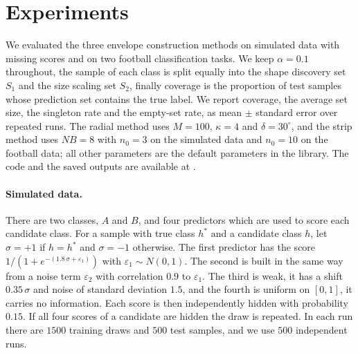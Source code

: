 \section{Experiments}\label{sec:experiments}

We evaluated the three envelope construction methods on simulated data with missing scores and on two football 
classification tasks. We keep $\alpha=0.1$ throughout, the sample of each class is split equally into the shape discovery 
set $S_1$ and the size scaling set $S_2$, finally coverage is the proportion of test samples whose prediction set contains 
the true label. We report coverage, the average set size, the singleton rate and the empty-set rate, as mean $\pm$ 
standard error over repeated runs. The radial method uses $M=100$, $\kappa=4$ and $\delta=30^\circ$, and the strip 
method uses $NB=8$ with $n_0=3$ on the simulated data and $n_0=10$ on the football data; all other parameters are the 
default parameters in the library. The code and the saved outputs are available at \cite{conformalenvelopes}.

\paragraph{Simulated data.} There are two classes, $A$ and $B$, and four predictors which are used to score each candidate 
class. For a sample with true class $h^\ast$ and a candidate class $h$, let $\sigma=+1$ if $h=h^\ast$ and $\sigma=-1$ 
otherwise. The first predictor has the score $1/(1+e^{-(1.8\,\sigma+\varepsilon_1)})$ with $\varepsilon_1\sim N(0,1)$. 
The second is built in the same way from a noise term $\varepsilon_2$ with correlation $0.9$ to $\varepsilon_1$. The 
third is weak, it has a shift $0.35\,\sigma$ and noise of standard deviation $1.5$, and the fourth is uniform on $[0,1]$, 
it carries no information. Each score is then independently hidden with probability $0.15$. If all four scores of a 
candidate are hidden the draw is repeated. In each run there are $1500$ training draws and $500$ test samples, and we use 
$500$ independent runs.

